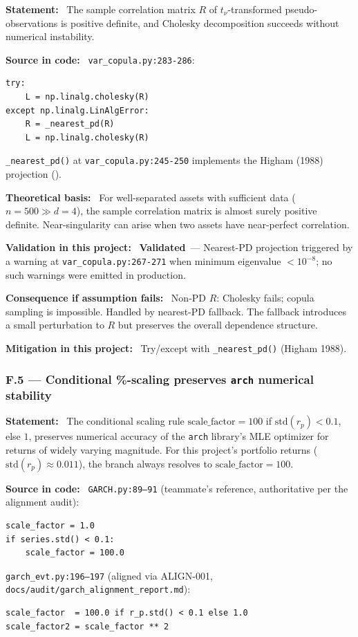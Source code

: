 \documentclass[11pt,a4paper]{article}
\newcommand{\asmfield}[1]{\medskip\noindent\textbf{#1:}\ }
\newcommand{\code}[1]{\texttt{#1}}
\newcommand{\validated}{\textbf{Validated}}
\begin{document}
\asmfield{Statement}
The sample correlation matrix $R$ of $t_\nu$-transformed pseudo-observations
is positive definite, and Cholesky decomposition succeeds without numerical
instability.

\asmfield{Source in code}
\code{var\_copula.py:283-286}:
\begin{lstlisting}
try:
    L = np.linalg.cholesky(R)
except np.linalg.LinAlgError:
    R = _nearest_pd(R)
    L = np.linalg.cholesky(R)
\end{lstlisting}
\code{\_nearest\_pd()} at \code{var\_copula.py:245-250} implements the
Higham (1988) projection (\cite{Higham1988}).

\asmfield{Theoretical basis}
For well-separated assets with sufficient data ($n = 500 \gg d = 4$), the
sample correlation matrix is almost surely positive definite. Near-singularity
can arise when two assets have near-perfect correlation.

\asmfield{Validation in this project}
\validated\ --- Nearest-PD projection triggered by a warning at
\code{var\_copula.py:267-271} when minimum eigenvalue $< 10^{-8}$; no such
warnings were emitted in production.

\asmfield{Consequence if assumption fails}
Non-PD $R$: Cholesky fails; copula sampling is impossible. Handled by
nearest-PD fallback. The fallback introduces a small perturbation to $R$
but preserves the overall dependence structure.

\asmfield{Mitigation in this project}
Try/except with \code{\_nearest\_pd()} (Higham 1988).

\subsubsection{F.5 --- Conditional \%-scaling preserves \texttt{arch} numerical stability}\label{asm:F5}

\asmfield{Statement}
The conditional scaling rule
$\mathrm{scale\_factor} = 100$ if $\mathrm{std}(r_p) < 0.1$, else $1$,
preserves numerical accuracy of the \texttt{arch} library's MLE optimizer
for returns of widely varying magnitude.  For this project's portfolio
returns ($\mathrm{std}(r_p) \approx 0.011$), the branch always resolves to
$\mathrm{scale\_factor} = 100$.

\asmfield{Source in code}
\code{GARCH.py:89--91} (teammate's reference, authoritative per the
alignment audit):
\begin{lstlisting}
scale_factor = 1.0
if series.std() < 0.1:
    scale_factor = 100.0
\end{lstlisting}
\code{garch\_evt.py:196--197} (aligned via ALIGN-001,
\texttt{docs/audit/garch\_alignment\_report.md}):
\begin{lstlisting}
scale_factor  = 100.0 if r_p.std() < 0.1 else 1.0
scale_factor2 = scale_factor ** 2
\end{lstlisting}
\end{document}
